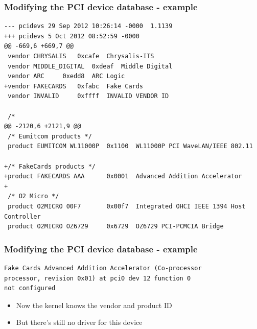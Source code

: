 \documentclass[dvipsnames,table]{beamer}
\begin{document}
\begin{frame}[fragile]
\frametitle{Modifying the PCI device database - example}
\scriptsize
\begin{verbatim}
--- pcidevs	29 Sep 2012 10:26:14 -0000	1.1139
+++ pcidevs	5 Oct 2012 08:52:59 -0000
@@ -669,6 +669,7 @@
 vendor CHRYSALIS	0xcafe	Chrysalis-ITS
 vendor MIDDLE_DIGITAL	0xdeaf	Middle Digital
 vendor ARC		0xedd8	ARC Logic
+vendor FAKECARDS	0xfabc	Fake Cards
 vendor INVALID		0xffff	INVALID VENDOR ID
 
 /*
@@ -2120,6 +2121,9 @@
 /* Eumitcom products */
 product EUMITCOM WL11000P	0x1100	WL11000P PCI WaveLAN/IEEE 802.11
 
+/* FakeCards products */
+product FAKECARDS AAA		0x0001	Advanced Addition Accelerator
+
 /* O2 Micro */
 product O2MICRO 00F7		0x00f7	Integrated OHCI IEEE 1394 Host Controller
 product O2MICRO OZ6729		0x6729	OZ6729 PCI-PCMCIA Bridge
\end{verbatim}
\end{frame}

\begin{frame}[fragile]
\frametitle{Modifying the PCI device database - example}
\begin{verbatim}
Fake Cards Advanced Addition Accelerator (Co-processor 
processor, revision 0x01) at pci0 dev 12 function 0 
not configured
\end{verbatim}
\begin{itemize}
	\item Now the kernel knows the vendor and product ID
	\item But there's still no driver for this device
\end{itemize}
\end{frame}
\end{document}

